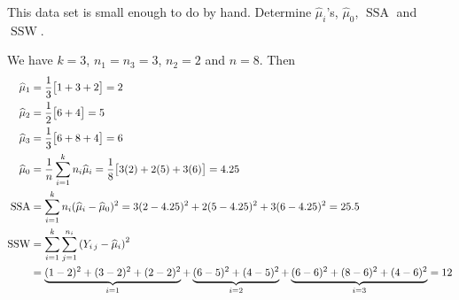 This data set is small enough to do by hand. Determine $\widehat{\mu}_i$'s, $\widehat{\mu}_0$, $\operatorname{SSA}$ and $\operatorname{SSW}$.

\soln We have $k=3$, $n_1 = n_3 = 3$, $n_2 = 2$ and $n = 8$. Then
\begin{align*}
    \muh_1 &= \over{3} \bigbrac{1 + 3 + 2} = 2\\
    \muh_2 &= \over{2} \bigbrac{6 + 4} = 5\\
    \muh_3 &= \over{3} \bigbrac{6+8+4} = 6\\
    \muh_0 &= \over{n} \sum_{i=1}^{k} n_i \muh_i = \over{8} \bigbrac{3(2)+2(5)+3(6)} = 4.25\\
    \operatorname{SSA} &= \sum_{i=1}^k n_i (\muh_i - \muh_0)^2 = 3 (2 - 4.25)^2 + 2 (5 - 4.25)^2 + 3 (6 - 4.25)^2 = 25.5\\
    \operatorname{SSW} &= \sum_{i=1}^k \sum_{j=1}^{n_i} \pars{Y_{i\,j} - \muh_i}^2\\
    &= \underbrace {
        (1-2)^2 + (3-2)^2 + (2-2)^2
    }_{i=1}
    + \underbrace{
        (6-5)^2 + (4-5)^2
    }_{i=2} + \underbrace{
        (6-6)^2 + (8-6)^2 + (4-6)^2
    }_{i=3}
    = 12
\end{align*}